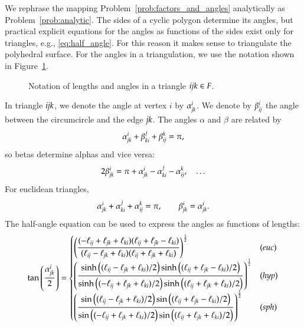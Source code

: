 \documentclass[Thesis]{subfiles}
\begin{document}
We rephrase the mapping Problem~\ref{prob:factors_and_angles}
analytically as Problem~\ref{prob:analytic}. The sides of a cyclic
polygon determine its angles, but practical explicit equations for the
angles as functions of the sides exist only for triangles, e.g.,
\eqref{eq:half_angle}. For this reason it makes sense to triangulate
the polyhedral surface. For the angles in a triangulation, we use the
notation shown in Figure~\ref{fig:triangle_notation}.
\begin{figure}
\centering
{}%
\caption{Notation of lengths and angles in a triangle ${\it ijk} \in F$.}
\label{fig:triangle_notation}	
\end{figure}
In triangle $\it ijk$, we denote the angle at vertex $i$ by
$\alpha^i_{\it jk}$. We denote by $\beta^i_{\it ij}$ the angle between
the circumcircle and the edge $\it jk$. The angles $\alpha$ and
$\beta$ are related by
\begin{equation*}
  \alpha_{\it jk}^i+\beta_{\it ki}^j+\beta_{\it ij}^k=\pi,
\end{equation*}
so betas determine alphas and vice versa:
\begin{equation}
  \label{eq:beta}
    2\beta_{\it jk}^i = \pi + \alpha_{\it jk}^i - \alpha_{\it ki}^j -
    \alpha_{\it ij}^k,\quad\ldots %
\end{equation}
For euclidean triangles, 
\begin{equation*}
  \alpha_{\it jk}^i+\alpha_{\it
    ki}^j+\alpha_{\it ij}^k=\pi,
  \qquad
  \beta_{\it jk}^i=\alpha_{\it jk}^i.
\end{equation*}
The half-angle equation can be used to express the angles as functions
of lengths:
\begin{equation}
\label{eq:half_angle}
\tan\left(\frac{ \alpha_{\it jk}^i}{2}\right) = 
\begin{cases}
  \left(\dfrac{
    (-\ell_{\it ij} +\ell_{\it jk} +\ell_{\it ki})
    (\ell_{\it ij} +\ell_{\it jk} -\ell_{\it ki})
  }{
    (\ell_{\it ij} -\ell_{\it jk} +\ell_{\it ki})
    (\ell_{\it ij} + \ell_{\it jk} +\ell_{\it ki})
  }\right)^{\frac{1}{2}}
  & (\euc)\\
  \left(\dfrac{
      \sinh\big((\ell_{\it ij}-\ell_{\it jk}+\ell_{\it ki})/2\big)
      \sinh\big((\ell_{\it ij}+\ell_{\it jk}-\ell_{\it ki})/2\big)
    }{
      \sinh\big((-\ell_{\it ij}+\ell_{\it jk}+\ell_{\it ki})/2\big)
      \sinh\big((\ell_{\it ij}+\ell_{\it jk}+\ell_{\it ki})/2\big)
    }\right)^{\frac{1}{2}}
  & (\hyp)\\
  \left(\dfrac{
      \sin\big((\ell_{\it ij}-\ell_{\it jk}+\ell_{\it ki})/2\big)
      \sin\big((\ell_{\it ij}+\ell_{\it jk}-\ell_{\it ki})/2\big)
    }{
      \sin\big((-\ell_{\it ij}+\ell_{\it jk}+\ell_{\it ki})/2\big)
      \sin\big((\ell_{\it ij}+\ell_{\it jk}+\ell_{\it ki})/2\big)
    }\right)^{\frac{1}{2}}
  & (\sph)
\end{cases}
\end{equation}
\end{document}
